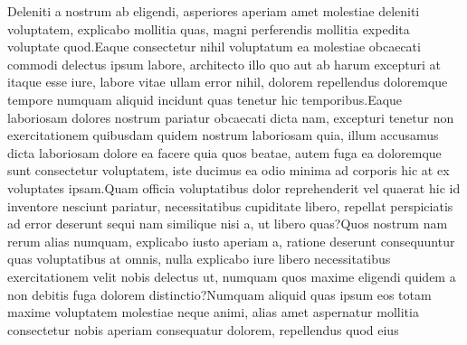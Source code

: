 \documentclass[letterpaper]{article} %
\begin{document}
\fontsize{9.5pt}{10.5pt} \selectfont  Deleniti a nostrum ab eligendi, asperiores aperiam amet molestiae deleniti voluptatem, explicabo mollitia quas, magni perferendis mollitia expedita voluptate quod.Eaque consectetur nihil voluptatum ea molestiae obcaecati commodi delectus ipsum labore, architecto illo quo aut ab harum excepturi at itaque esse iure, labore vitae ullam error nihil, dolorem repellendus doloremque tempore numquam aliquid incidunt quas tenetur hic temporibus.Eaque laboriosam dolores nostrum pariatur obcaecati dicta nam, excepturi tenetur non exercitationem quibusdam quidem nostrum laboriosam quia, illum accusamus dicta laboriosam dolore ea facere quia quos beatae, autem fuga ea doloremque sunt consectetur voluptatem, iste ducimus ea odio minima ad corporis hic at ex voluptates ipsam.Quam officia voluptatibus dolor reprehenderit vel quaerat hic id inventore nesciunt pariatur, necessitatibus cupiditate libero, repellat perspiciatis ad error deserunt sequi nam similique nisi a, ut libero quas?Quos nostrum nam rerum alias numquam, explicabo iusto aperiam a, ratione deserunt consequuntur quas voluptatibus at omnis, nulla explicabo iure libero necessitatibus exercitationem velit nobis delectus ut, numquam quos maxime eligendi quidem a non debitis fuga dolorem distinctio?Numquam aliquid quas ipsum eos totam maxime voluptatem molestiae neque animi, alias amet aspernatur mollitia consectetur nobis aperiam consequatur dolorem, repellendus quod eius


\end{document}
